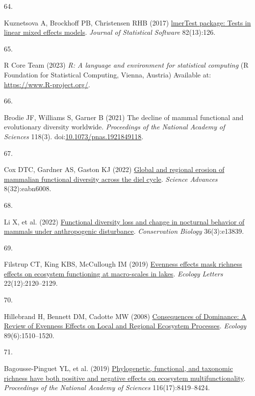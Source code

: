 \documentclass{article}
\newlength{\cslhangindent}
\newlength{\csllabelwidth}
\newlength{\cslentryspacingunit} %
\newenvironment{CSLReferences}[2] %
 {%
  \setlength{\parindent}{0pt}
  \ifodd #1
  \let\oldpar\par
  \def\par{\hangindent=\cslhangindent\oldpar}
  \fi
  \setlength{\parskip}{#2\cslentryspacingunit}
 }%
 {}
\newcommand{\CSLLeftMargin}[1]{\parbox[t]{\csllabelwidth}{#1}}
\newcommand{\CSLRightInline}[1]{\parbox[t]{\linewidth - \csllabelwidth}{#1}\break}
\begin{document}
\begin{CSLReferences}{0}{0}
\leavevmode{}%
\CSLLeftMargin{64. }%
\CSLRightInline{Kuznetsova A, Brockhoff PB, Christensen RHB (2017)
\href{https://doi.org/10.18637/jss.v082.i13}{lmerTest package: Tests in
linear mixed effects models}. \emph{Journal of Statistical Software}
82(13):126.}

\leavevmode{}%
\CSLLeftMargin{65. }%
\CSLRightInline{R Core Team (2023) \emph{R: A language and environment
for statistical computing} (R Foundation for Statistical Computing,
Vienna, Austria) Available at: \url{https://www.R-project.org/}.}

\leavevmode{}%
\CSLLeftMargin{66. }%
\CSLRightInline{Brodie JF, Williams S, Garner B (2021) The decline of
mammal functional and evolutionary diversity worldwide.
\emph{Proceedings of the National Academy of Sciences} 118(3).
doi:\href{https://doi.org/10.1073/pnas.1921849118}{10.1073/pnas.1921849118}.}

\leavevmode{}%
\CSLLeftMargin{67. }%
\CSLRightInline{Cox DTC, Gardner AS, Gaston KJ (2022)
\href{https://doi.org/10.1126/sciadv.abn6008}{Global and regional
erosion of mammalian functional diversity across the diel cycle}.
\emph{Science Advances} 8(32):eabn6008.}

\leavevmode{}%
\CSLLeftMargin{68. }%
\CSLRightInline{Li X, et al. (2022)
\href{https://doi.org/10.1111/cobi.13839}{Functional diversity loss and
change in nocturnal behavior of mammals under anthropogenic
disturbance}. \emph{Conservation Biology} 36(3):e13839.}

\leavevmode{}%
\CSLLeftMargin{69. }%
\CSLRightInline{Filstrup CT, King KBS, McCullough IM (2019)
\href{https://doi.org/10.1111/ele.13407}{Evenness effects mask richness
effects on ecosystem functioning at macro-scales in lakes}.
\emph{Ecology Letters} 22(12):2120--2129.}

\leavevmode{}%
\CSLLeftMargin{70. }%
\CSLRightInline{Hillebrand H, Bennett DM, Cadotte MW (2008)
\href{https://doi.org/10.1890/07-1053.1}{Consequences of Dominance: A
Review of Evenness Effects on Local and Regional Ecosystem Processes}.
\emph{Ecology} 89(6):1510--1520.}

\leavevmode{}%
\CSLLeftMargin{71. }%
\CSLRightInline{Bagousse-Pinguet YL, et al. (2019)
\href{https://doi.org/10.1073/pnas.1815727116}{Phylogenetic, functional,
and taxonomic richness have both positive and negative effects on
ecosystem multifunctionality}. \emph{Proceedings of the National Academy
of Sciences} 116(17):8419--8424.}


\end{CSLReferences}
\end{document}
